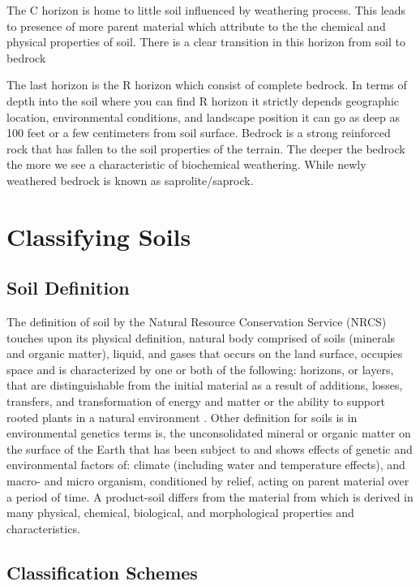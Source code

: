 The C horizon is home to little soil influenced by weathering process. This leads to presence of more parent material which attribute to the the chemical and physical properties of soil. There is a clear transition in this horizon from soil to bedrock

The last horizon is the R horizon which consist of complete bedrock. In terms of depth into the soil where you can find R horizon it strictly depends geographic location, environmental conditions, and landscape position it can go as deep as 100 feet or a few centimeters from soil surface. Bedrock is a strong reinforced rock that has fallen to the soil properties of the terrain. The deeper the bedrock the more we see a characteristic of biochemical weathering. While newly weathered bedrock is known as saprolite/saprock.

\section{Classifying Soils}

\subsection{Soil Definition}

The definition of soil by the Natural Resource Conservation Service (NRCS) touches upon its physical definition, natural body comprised of soils (minerals and organic matter), liquid, and gases that occurs on the land surface, occupies space and is characterized by one or both of the following: horizons, or layers, that are distinguishable from the initial material as a result of additions, losses, transfers, and transformation of energy and matter or the ability to support rooted plants in a natural environment \citep{baillie2001soil}. Other definition for soils is in environmental genetics terms is, the unconsolidated mineral or organic matter on the surface of the Earth that has been subject to and shows effects of genetic and environmental factors of: climate (including water and temperature effects), and macro- and micro organism, conditioned by relief, acting on parent material over a period of time. A product-soil differs from the material from which is derived in many physical, chemical, biological, and morphological properties and characteristics. 
 
\subsection {Classification Schemes}

